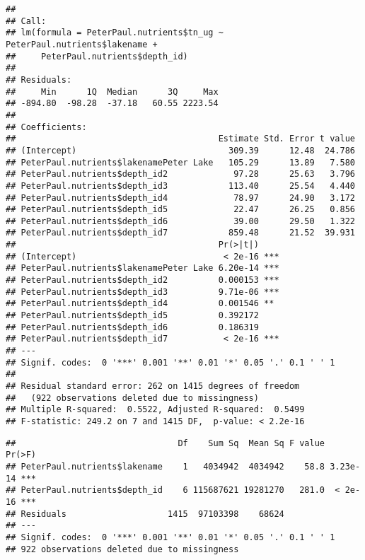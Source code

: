 \documentclass[]{article}
\newenvironment{Shaded}{\begin{snugshade}}{\end{snugshade}}
\newcommand{\KeywordTok}[1]{\textcolor[rgb]{0.13,0.29,0.53}{\textbf{#1}}}
\newcommand{\StringTok}[1]{\textcolor[rgb]{0.31,0.60,0.02}{#1}}
\newcommand{\OperatorTok}[1]{\textcolor[rgb]{0.81,0.36,0.00}{\textbf{#1}}}
\newcommand{\NormalTok}[1]{#1}
\begin{document}
\begin{verbatim}
## 
## Call:
## lm(formula = PeterPaul.nutrients$tn_ug ~ PeterPaul.nutrients$lakename + 
##     PeterPaul.nutrients$depth_id)
## 
## Residuals:
##     Min      1Q  Median      3Q     Max 
## -894.80  -98.28  -37.18   60.55 2223.54 
## 
## Coefficients:
##                                        Estimate Std. Error t value
## (Intercept)                              309.39      12.48  24.786
## PeterPaul.nutrients$lakenamePeter Lake   105.29      13.89   7.580
## PeterPaul.nutrients$depth_id2             97.28      25.63   3.796
## PeterPaul.nutrients$depth_id3            113.40      25.54   4.440
## PeterPaul.nutrients$depth_id4             78.97      24.90   3.172
## PeterPaul.nutrients$depth_id5             22.47      26.25   0.856
## PeterPaul.nutrients$depth_id6             39.00      29.50   1.322
## PeterPaul.nutrients$depth_id7            859.48      21.52  39.931
##                                        Pr(>|t|)    
## (Intercept)                             < 2e-16 ***
## PeterPaul.nutrients$lakenamePeter Lake 6.20e-14 ***
## PeterPaul.nutrients$depth_id2          0.000153 ***
## PeterPaul.nutrients$depth_id3          9.71e-06 ***
## PeterPaul.nutrients$depth_id4          0.001546 ** 
## PeterPaul.nutrients$depth_id5          0.392172    
## PeterPaul.nutrients$depth_id6          0.186319    
## PeterPaul.nutrients$depth_id7           < 2e-16 ***
## ---
## Signif. codes:  0 '***' 0.001 '**' 0.01 '*' 0.05 '.' 0.1 ' ' 1
## 
## Residual standard error: 262 on 1415 degrees of freedom
##   (922 observations deleted due to missingness)
## Multiple R-squared:  0.5522, Adjusted R-squared:  0.5499 
## F-statistic: 249.2 on 7 and 1415 DF,  p-value: < 2.2e-16
\end{verbatim}

\begin{Shaded}
\end{Shaded}

\begin{verbatim}
##                                Df    Sum Sq  Mean Sq F value   Pr(>F)    
## PeterPaul.nutrients$lakename    1   4034942  4034942    58.8 3.23e-14 ***
## PeterPaul.nutrients$depth_id    6 115687621 19281270   281.0  < 2e-16 ***
## Residuals                    1415  97103398    68624                     
## ---
## Signif. codes:  0 '***' 0.001 '**' 0.01 '*' 0.05 '.' 0.1 ' ' 1
## 922 observations deleted due to missingness
\end{verbatim}
\end{document}
